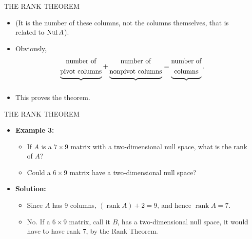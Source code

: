 \begin{frame}[shrink=8]{THE RANK THEOREM}
\begin{itemize}
\item (It is the number of these columns, not the columns themselves, that is related to $\operatorname{Nul} A$).
\item Obviously,
\[
\underbrace{\begin{gathered}\text{number of}\\\text{pivot columns}\end{gathered}}_{\vphantom{X}}
+
\underbrace{\begin{gathered}\text{number of}\\\text{nonpivot columns}\end{gathered}}_{\vphantom{X}}
=
\underbrace{\begin{gathered}\text{number of}\\\text{columns}\end{gathered}}_{\vphantom{X}}.
\]
\item This proves the theorem.
\end{itemize}
\end{frame}

\begin{frame}[shrink=8]{THE RANK THEOREM}
\begin{itemize}
\item \textbf{Example 3:}
\begin{itemize}
\item[a.] If $A$ is a $7\times9$ matrix with a two-dimensional null space, what is the rank of $A$?
\item[b.] Could a $6\times9$ matrix have a two-dimensional null space?
\end{itemize}
\item \textbf{Solution:}
\begin{itemize}
\item[a.] Since $A$ has 9 columns, $(\operatorname{rank}A)+2=9$, and hence $\operatorname{rank}A=7$.
\item[b.] No. If a $6\times9$ matrix, call it $B$, has a two-dimensional null space, it would have to have rank 7, by the Rank Theorem.
\end{itemize}
\end{itemize}
\end{frame}

